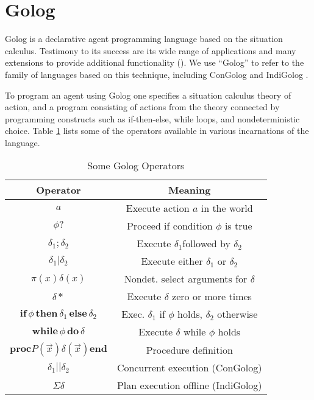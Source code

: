 \section{Golog}

Golog \cite{levesque97golog} is a declarative agent programming language
based on the situation calculus. Testimony to its success are its
wide range of applications and many extensions to provide additional
functionality (\cite{giacomo00congolog,giacomo99indigolog,Ferrein2005readylog}).
We use {}``Golog'' to refer to the family of languages based on
this technique, including ConGolog \cite{giacomo00congolog} and IndiGolog
\cite{giacomo99indigolog}.

To program an agent using Golog one specifies a situation calculus
theory of action, and a program consisting of actions from the theory
connected by programming constructs such as if-then-else, while loops,
and nondeterministic choice. Table \ref{tbl:Golog-Operators} lists
some of the operators available in various incarnations of the language.%
\begin{table}
\begin{centering}
\begin{tabular}{|c|c|}
\hline 
Operator & Meaning\tabularnewline
\hline
\hline 
$a$ & Execute action $a$ in the world\tabularnewline
\hline 
$\phi?$ & Proceed if condition $\phi$ is true\tabularnewline
\hline 
$\delta_{1};\delta_{2}$ & Execute $\delta_{1}$followed by $\delta_{2}$\tabularnewline
\hline 
$\delta_{1}|\delta_{2}$ & Execute either $\delta_{1}$ or $\delta_{2}$\tabularnewline
\hline 
$\pi(x)\delta(x)$ & Nondet. select arguments for $\delta$\tabularnewline
\hline 
$\delta*$ & Execute $\delta$ zero or more times\tabularnewline
\hline 
$\mathbf{if}\,\phi\,\mathbf{then}\,\delta_{1}\,\mathbf{else}\,\delta_{2}$ & Exec. $\delta_{1}$ if $\phi$ holds, $\delta_{2}$ otherwise\tabularnewline
\hline 
$\mathbf{while\,}\phi\mathbf{\, do}\,\delta$ & Execute $\delta$ while $\phi$ holds\tabularnewline
\hline 
$\mathbf{proc}P(\overrightarrow{x})\delta(\overrightarrow{x})\mathbf{end}$ & Procedure definition\tabularnewline
\hline 
$\delta_{1}||\delta_{2}$ & Concurrent execution (ConGolog)\tabularnewline
\hline 
$\Sigma\delta$ & Plan execution offline (IndiGolog)\tabularnewline
\hline
\end{tabular}
\par\end{centering}

\caption{
Some Golog Operators\label{tbl:Golog-Operators}
}

\end{table}


